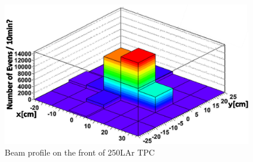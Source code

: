    \begin{figure}[!htb]
    \centering
    \centering
    \includegraphics[width=11cm,clip]{./fig/BeamProfile3.eps}
    \caption{Beam profile on the front of 250LAr TPC}
    \label{beamprofile_250L}
   \end{figure}
